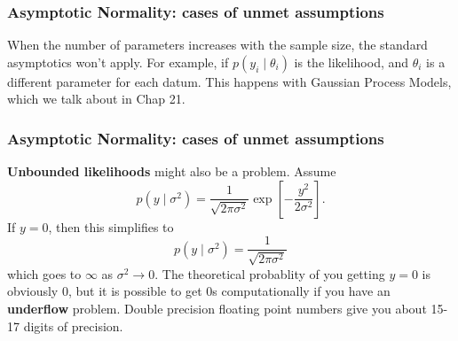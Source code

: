 \documentclass{beamer}
\begin{document}
\begin{frame}
\frametitle{Asymptotic Normality: cases of unmet assumptions}

When the number of parameters increases with the sample size, the standard asymptotics won't apply. For example, if $p(y_i \mid \theta_i)$ is the likelihood, and $\theta_i$ is a different parameter for each datum. This happens with Gaussian Process Models, which we talk about in Chap 21.

\end{frame}

\begin{frame}
\frametitle{Asymptotic Normality: cases of unmet assumptions}

{\bf Unbounded likelihoods} might also be a problem. Assume 
\[
p(y \mid \sigma^2) = \frac{1}{\sqrt{2 \pi \sigma^2}}\exp\left[ -\frac{y^2}{2 \sigma^2} \right].
\]
If $y=0$, then this simplifies to
\[
p(y \mid \sigma^2) = \frac{1}{\sqrt{2 \pi \sigma^2}}
\]
which goes to $\infty$ as $\sigma^2 \to 0$. The theoretical probablity of you getting $y=0$ is obviously $0$, but it is possible to get $0$s computationally if you have an {\bf underflow} problem. Double precision floating point numbers give you about 15-17 digits of precision. 


\end{frame}
\end{document}
